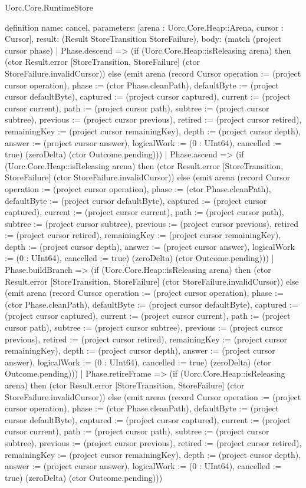 \begin{lexlean}{Uorc.Core.RuntimeStore}
\begin{semanticmodule}
definition{
  name: cancel,
  parameters: [arena : Uorc.Core.Heap::Arena, cursor : Cursor],
  result: (Result StoreTransition StoreFailure),
  body: (match (project cursor phase)
    | Phase.descend => (if (Uorc.Core.Heap::isReleasing arena) then (ctor Result.error [StoreTransition, StoreFailure] (ctor StoreFailure.invalidCursor)) else (emit arena (record Cursor {operation := (project cursor operation), phase := (ctor Phase.cleanPath), defaultByte := (project cursor defaultByte), captured := (project cursor captured), current := (project cursor current), path := (project cursor path), subtree := (project cursor subtree), previous := (project cursor previous), retired := (project cursor retired), remainingKey := (project cursor remainingKey), depth := (project cursor depth), answer := (project cursor answer), logicalWork := (0 : UInt64), cancelled := true}) (zeroDelta) (ctor Outcome.pending)))
    | Phase.ascend => (if (Uorc.Core.Heap::isReleasing arena) then (ctor Result.error [StoreTransition, StoreFailure] (ctor StoreFailure.invalidCursor)) else (emit arena (record Cursor {operation := (project cursor operation), phase := (ctor Phase.cleanPath), defaultByte := (project cursor defaultByte), captured := (project cursor captured), current := (project cursor current), path := (project cursor path), subtree := (project cursor subtree), previous := (project cursor previous), retired := (project cursor retired), remainingKey := (project cursor remainingKey), depth := (project cursor depth), answer := (project cursor answer), logicalWork := (0 : UInt64), cancelled := true}) (zeroDelta) (ctor Outcome.pending)))
    | Phase.buildBranch => (if (Uorc.Core.Heap::isReleasing arena) then (ctor Result.error [StoreTransition, StoreFailure] (ctor StoreFailure.invalidCursor)) else (emit arena (record Cursor {operation := (project cursor operation), phase := (ctor Phase.cleanPath), defaultByte := (project cursor defaultByte), captured := (project cursor captured), current := (project cursor current), path := (project cursor path), subtree := (project cursor subtree), previous := (project cursor previous), retired := (project cursor retired), remainingKey := (project cursor remainingKey), depth := (project cursor depth), answer := (project cursor answer), logicalWork := (0 : UInt64), cancelled := true}) (zeroDelta) (ctor Outcome.pending)))
    | Phase.retireFrame => (if (Uorc.Core.Heap::isReleasing arena) then (ctor Result.error [StoreTransition, StoreFailure] (ctor StoreFailure.invalidCursor)) else (emit arena (record Cursor {operation := (project cursor operation), phase := (ctor Phase.cleanPath), defaultByte := (project cursor defaultByte), captured := (project cursor captured), current := (project cursor current), path := (project cursor path), subtree := (project cursor subtree), previous := (project cursor previous), retired := (project cursor retired), remainingKey := (project cursor remainingKey), depth := (project cursor depth), answer := (project cursor answer), logicalWork := (0 : UInt64), cancelled := true}) (zeroDelta) (ctor Outcome.pending)))
}
\end{semanticmodule}
\end{lexlean}
